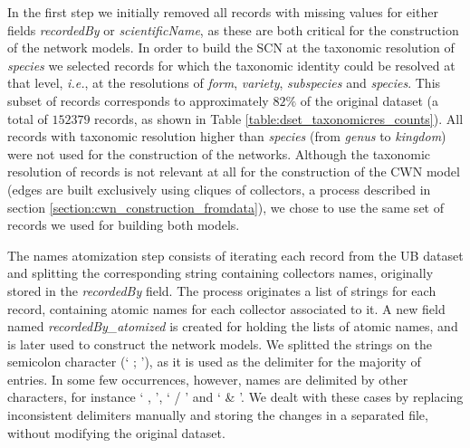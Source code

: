In the first step we initially removed all records with missing values for either fields \textit{recordedBy} or \textit{scientificName}, as these are both critical for the construction of the network models.
In order to build the SCN at the taxonomic resolution of \textit{species} we selected records for which the taxonomic identity could be resolved at that level, \textit{i.e.}, at the resolutions of \textit{form}, \textit{variety}, \textit{subspecies} and \textit{species}. 
This subset of records corresponds to approximately $82\%$ of the original dataset (a total of $152379$ records, as shown in Table \ref{table:dset_taxonomicres_counts}).
All records with taxonomic resolution higher than \textit{species} (from \textit{genus} to \textit{kingdom}) were not used for the construction of the networks.
Although the taxonomic resolution of records is not relevant at all for the construction of the CWN model (edges are built exclusively using cliques of collectors, a process described in section \ref{section:cwn_construction_fromdata}), we chose to use the same set of records we used for building both models.

The names atomization step consists of iterating each record from the UB dataset and splitting the corresponding string containing collectors names, originally stored in the \textit{recordedBy} field. 
The process originates a list of strings for each record, containing atomic names for each collector associated to it.
A new field named \textit{recordedBy\_atomized} is created for holding the lists of atomic names, and is later used to construct the network models.
We splitted the strings on the semicolon character (` ; '), as it is used as the delimiter for the majority of entries.
In some few occurrences, however, names are delimited by other characters, for instance ` , ', ` / ' and ` \& '.
We dealt with these cases by replacing inconsistent delimiters manually and storing the changes in a separated file, without modifying the original dataset.


